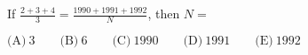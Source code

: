 

If $\frac{2+3+4}{3}=\frac{1990+1991+1992}{N}$, then $N=$

$\text{(A)}\ 3 \qquad \text{(B)}\ 6 \qquad \text{(C)}\ 1990 \qquad \text{(D)}\ 1991 \qquad \text{(E)}\ 1992$
